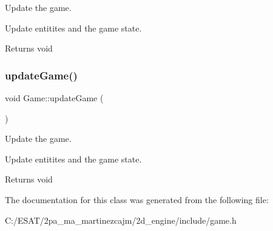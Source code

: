 Update the game. 

Update entitites and the game state.

\begin{DoxyReturn}{Returns}
void 
\end{DoxyReturn}
\mbox{\label{class_game_a67a8c5c0356c9ad33fac1abc435a3746}} 
\subsubsection{\texorpdfstring{update\+Game()}{updateGame()}}
{\footnotesize\ttfamily void Game\+::update\+Game (\begin{DoxyParamCaption}{ }\end{DoxyParamCaption})}



Update the game. 

Update entitites and the game state.

\begin{DoxyReturn}{Returns}
void 
\end{DoxyReturn}


The documentation for this class was generated from the following file\+:\begin{DoxyCompactItemize}
\item 
C\+:/\+E\+S\+A\+T/2pa\+\_\+ma\+\_\+martinezcajm/2d\+\_\+engine/include/game.\+h\end{DoxyCompactItemize}
